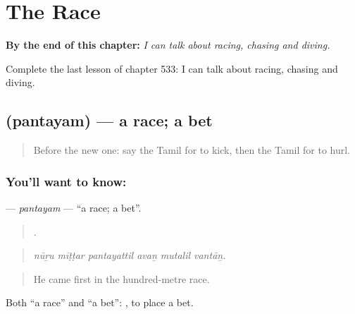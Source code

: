 
\chapter{The Race}
\label{ch:ta-the-race}

\begin{chapteropening}
\textbf{By the end of this chapter:} \emph{I can talk about racing, chasing and diving.}

Complete the last lesson of chapter 533: I can talk about racing, chasing and diving.
\end{chapteropening}

\section[\texorpdfstring{\ta{பந்தயம்} (pantayam)}{பந்தயம் (pantayam)}]{ (pantayam) — a race; a bet}

\label{lesson:TA-C533-pantayam}



\begin{quote}
Before the new one: say the Tamil for to kick, then the Tamil for to hurl.
\end{quote}

\subsection*{You'll want to know: }
\textbf{} — \emph{pantayam} — \textquotedblleft{}a race; a bet\textquotedblright{}.

\begin{quote}
     .
\end{quote}

\begin{quote}
\emph{nūṟu mīṭṭar pantayattil avaṉ mutalil vantāṉ.}
\end{quote}

\begin{quote}
He came first in the hundred-metre race.
\end{quote}

Both \textquotedblleft{}a race\textquotedblright{} and \textquotedblleft{}a bet\textquotedblright{}:  , to place a bet.

